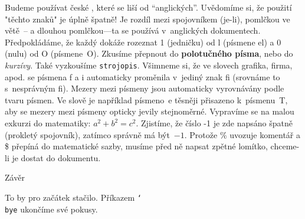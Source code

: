 \itemskip
\bod Budeme používat české , které se liší od ``anglických''.
     Uvědomíme si, že použití "těchto znaků" je úplně špatně!
\bod Je rozdíl mezi spojovníkem (je-li), pomlčkou ve větě~--
     a dlouhou pomlčkou---ta se používá v~anglických dokumentech.
\bod Předpokládáme, že každý dokáže rozeznat 1 (jedničku) od l
     (písmene el) a 0 (nulu) od O (písmene~O).
\bod Zkusíme přepnout do {\bf polotučného písma}, nebo do
     {\it kurzívy}. Také vyzkoušíme {\tt strojopis}.
\bod Všimneme si, že ve slovech grafika, firma, apod. se písmena
     f a i automaticky proměnila v~jediný znak fi (srovnáme to
     s~nesprávným f\/i).
\bod Mezery mezi písmeny jsou automaticky vyrovnávány podle tvaru písmen.
     Ve slově  je například písmeno~e těsněji přisazeno
     k~písmenu~T, aby se mezery mezi písmeny opticky jevily stejnoměrné.
\bod Vypravíme se na malou exkurzi do matematiky: $a^2 + b^2 = c^2$.
     Zjistíme, že číslo -1 je zde napsáno špatně (prokletý spojovník),
     zatímco správně má být~$-1$.
\bod Protože \% uvozuje komentář a \$ přepíná do matematické sazby,
     musíme před ně napsat zpětné lomítko, chceme-li je dostat do dokumentu.
\itemskip

\nadpis Závěr

To by pro začátek stačilo. Příkazem {\tt\char`\\bye} ukončíme své pokusy.
\bye

